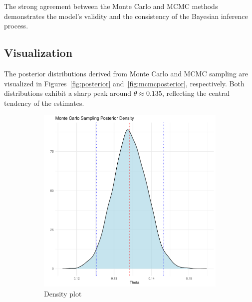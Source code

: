 \documentclass[12pt,a4paper]{article}
\begin{document}
The strong agreement between the Monte Carlo and MCMC methods demonstrates the model's validity and the
consistency of the Bayesian inference process.

\subsection{Visualization}\label{ssec:visualisations}

The posterior distributions derived from Monte Carlo and MCMC sampling are visualized in
Figures~\ref{fig:posterior} and~\ref{fig:mcmcposterior}, respectively. Both distributions exhibit a sharp
peak around $\theta \approx 0.135$, reflecting the central tendency of the estimates.

\begin{figure}[!ht]
    \centering
    \begin{subfigure}{0.49\textwidth}
        \includegraphics[width=\textwidth]{figures/beta_posterior_density_plot.pdf}
        \caption{Density plot}\label{fig:posteriordensityplot}
    \end{subfigure}
    \begin{subfigure}{0.49\textwidth}

\end{subfigure}
\end{figure}
\end{document}
